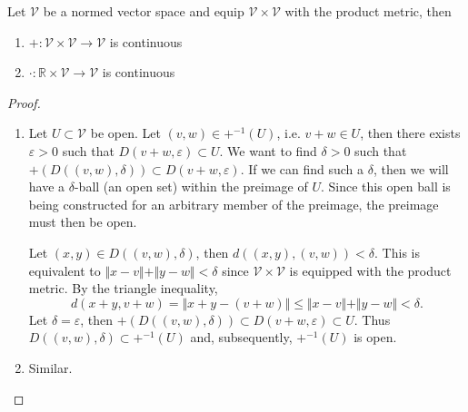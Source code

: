 \documentclass[10pt]{report}
\begin{document}
\begin{prop}
	Let $\mathcal{V}$ be a normed vector space and equip $\mathcal{V} \times \mathcal{V}$ with the product metric, then
	\begin{enumerate}
		\item $+:\mathcal{V}\times \mathcal{V} \to \mathcal{V}$ is continuous
		\item $\cdot:\mathbb{R} \times \mathcal{V} \to \mathcal{V}$ is continuous
	\end{enumerate}
\end{prop}
\begin{proof}
	\begin{enumerate}
		\item Let $U \subset \mathcal{V}$ be open. Let $(v,w) \in +^{-1}(U)$, i.e. $v+w \in U$, then there exists $\varepsilon>0$ such that $D(v+w,\varepsilon) \subset U$. We want to find $\delta>0$ such that $+(D( (v,w), \delta)) \subset D(v+w,\varepsilon)$. If we can find such a $\delta$, then we will have a $\delta$-ball (an open set) within the preimage of $U$. Since this open ball is being constructed for an arbitrary member of the preimage, the preimage must then be open.

			Let $(x,y) \in D( (v,w), \delta)$, then $d( (x,y), (v,w) ) < \delta$. This is equivalent to $\Vert{x-v}\Vert+\Vert{y-w}\Vert<\delta$ since $\mathcal{V}\times \mathcal{V}$ is equipped with the product metric. By the triangle inequality,
			\[
				d(x+y,v+w) = \Vert{x+y - (v+w)}\Vert \leq \Vert{x-v}\Vert+\Vert{y-w}\Vert < \delta.
			\] 
			Let $\delta=\varepsilon$, then $+(D( (v,w), \delta)) \subset D(v+w,\varepsilon) \subset U$. Thus $D( (v,w), \delta) \subset +^{-1}(U)$ and, subsequently, $+^{-1}(U)$ is open.

		\item Similar.
	\end{enumerate}
\end{proof}
\end{document}
